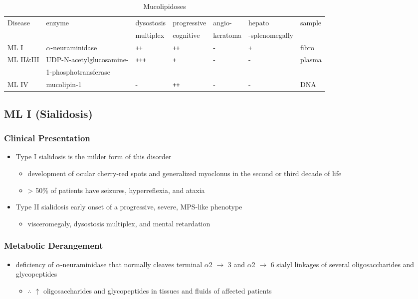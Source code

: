\documentclass[12pt]{scrartcl}
\begin{document}
\begin{table}[htbp]
\caption{\label{tab:org6c143fd}Mucolipidoses}
\centering
\small
\begin{tabular}{lllllll}
Disease & enzyme & dysostosis & progressive & angio- & hepato & sample\\
 &  & multiplex & cognitive & keratoma & -splenomegally & \\
\hline
ML I & \(\alpha\)-neuraminidase & \texttt{++} & \texttt{++} & - & \texttt{+} & fibro\\
ML II\&III & UDP-N-acetylglucosamine- & \texttt{+++} & \texttt{+} & - & - & plasma\\
 & 1-phosphotransferase &  &  &  &  & \\
ML IV & mucolipin-1 & - & \texttt{++} & - & - & DNA\\
\end{tabular}
\end{table}

\subsection{ML I (Sialidosis)}
\label{sec:org2805fc7}
\subsubsection{Clinical Presentation}
\label{sec:org29896b6}
\begin{itemize}
\item Type I sialidosis is the milder form of this disorder
\begin{itemize}
\item development of ocular cherry-red spots and generalized
myoclonus in the second or third decade of life
\item \textgreater{} 50\% of patients have seizures, hyperreflexia, and ataxia
\end{itemize}

\item Type II sialidosis early onset of a progressive, severe, MPS-like
phenotype
\begin{itemize}
\item visceromegaly, dysostosis multiplex, and mental retardation
\end{itemize}
\end{itemize}

\subsubsection{Metabolic Derangement}
\label{sec:org561a25e}
\begin{itemize}
\item deficiency of \(\alpha\)-neuraminidase that normally cleaves terminal
\(\alpha\)2 \(\to\) 3 and \(\alpha\)2 \(\to\) 6 sialyl linkages of several
oligosaccharides and glycopeptides
\begin{itemize}
\item \(\therefore\) \(\uparrow\) oligosaccharides and glycopeptides in tissues
and fluids of affected patients
\end{itemize}
\end{itemize}
\end{document}
